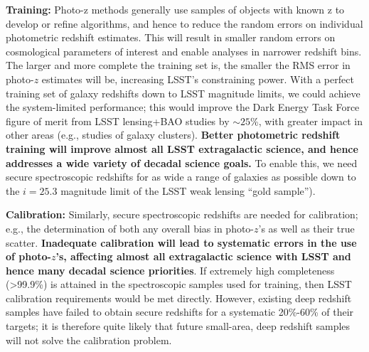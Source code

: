 
{\bf Training:} Photo-z methods generally use samples of objects with known z to develop or refine algorithms, and hence to reduce the random errors on individual photometric redshift estimates. This will result in smaller random errors on cosmological parameters of interest and enable analyses in narrower redshift bins.  The larger and more complete the training set is, the smaller the RMS error in photo-$z$ estimates will be, increasing LSST's constraining power.
With a perfect training set of galaxy redshifts down to LSST magnitude limits, we could achieve the system-limited performance; this would improve the Dark Energy Task Force figure of merit from LSST lensing+BAO studies by $\sim25$\%, with greater impact in other areas (e.g., studies of galaxy clusters).  {\bf Better photometric redshift training will improve almost all LSST extragalactic science, and hence addresses a wide variety of decadal science goals.}  To enable this, we need secure spectroscopic redshifts for as wide a range of galaxies as possible down to the $i=25.3$ magnitude limit of the LSST weak lensing ``gold sample'').


{\bf Calibration:} Similarly, secure spectroscopic redshifts are needed for {calibration}; e.g., the determination of both any overall bias in photo-$z$'s  as well as their true scatter.  {\bf Inadequate calibration will lead to systematic errors in the use of photo-$z$'s, affecting almost all extragalactic science with LSST and hence many decadal science priorities}.
If extremely high completeness (>99.9\%) is attained in the spectroscopic samples used for training, then LSST calibration requirements would be met directly. However, existing deep redshift samples have failed to obtain secure redshifts for a systematic 20\%-60\% of their targets; it is therefore quite likely that future small-area, deep redshift samples will not solve the calibration problem.


